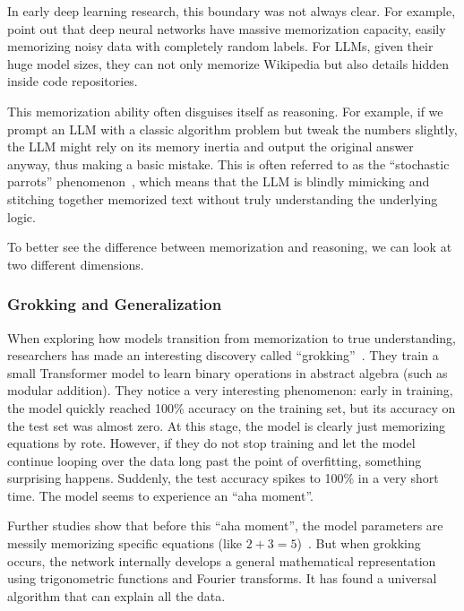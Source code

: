 In early deep learning research, this boundary was not always clear. For example, \citet{zhang-etal:2021understand} point out that deep neural networks have massive memorization capacity, easily memorizing noisy data with completely random labels. For LLMs, given their huge model sizes, they can not only memorize Wikipedia but also details hidden inside code repositories.

This memorization ability often disguises itself as reasoning. For example, if we prompt an LLM with a classic algorithm problem but tweak the numbers slightly, the LLM might rely on its memory inertia and output the original answer anyway, thus making a basic mistake. This is often referred to as the ``stochastic parrots'' phenomenon~\cite{bender-etal:2021dangers}, which means that the LLM is blindly mimicking and stitching together memorized text without truly understanding the underlying logic.

To better see the difference between memorization and reasoning, we can look at two different dimensions.

\subsubsection{Grokking and Generalization}

When exploring how models transition from memorization to true understanding, researchers has made an interesting discovery called ``grokking''~\cite{power-etal:2022grokking}. They train a small Transformer model to learn binary operations in abstract algebra (such as modular addition). They notice a very interesting phenomenon: early in training, the model quickly reached 100\% accuracy on the training set, but its accuracy on the test set was almost zero. At this stage, the model is clearly just memorizing equations by rote. However, if they do not stop training and let the model continue looping over the data long past the point of overfitting, something surprising happens. Suddenly, the test accuracy spikes to 100\% in a very short time. The model seems to experience an ``aha moment''.


Further studies show that before this ``aha moment'', the model parameters are messily memorizing specific equations (like $2 + 3 = 5$)~\cite{nanda-etal:2023progress}. But when grokking occurs, the network internally develops a general mathematical representation using trigonometric functions and Fourier transforms. It has found a universal algorithm that can explain all the data.

